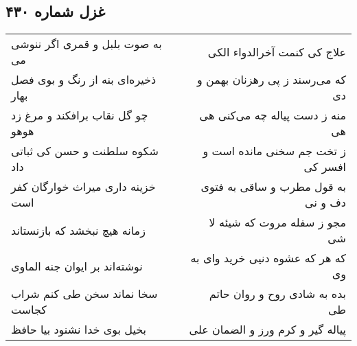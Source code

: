 \begin{center}
\section*{غزل شماره ۴۳۰}
\label{sec:sh430}
\begin{longtable}{l p{0.5cm} r}
به صوت بلبل و قمری اگر ننوشی می
&&
علاج کی کنمت آخرالدواء الکی
\\
ذخیره‌ای بنه از رنگ و بوی فصل بهار
&&
که می‌رسند ز پی رهزنان بهمن و دی
\\
چو گل نقاب برافکند و مرغ زد هوهو
&&
منه ز دست پیاله چه می‌کنی هی هی
\\
شکوه سلطنت و حسن کی ثباتی داد
&&
ز تخت جم سخنی مانده است و افسر کی
\\
خزینه داری میراث خوارگان کفر است
&&
به قول مطرب و ساقی به فتوی دف و نی
\\
زمانه هیچ نبخشد که بازنستاند
&&
مجو ز سفله مروت که شیئه لا شی
\\
نوشته‌اند بر ایوان جنه الماوی
&&
که هر که عشوه دنیی خرید وای به وی
\\
سخا نماند سخن طی کنم شراب کجاست
&&
بده به شادی روح و روان حاتم طی
\\
بخیل بوی خدا نشنود بیا حافظ
&&
پیاله گیر و کرم ورز و الضمان علی
\\
\end{longtable}
\end{center}
